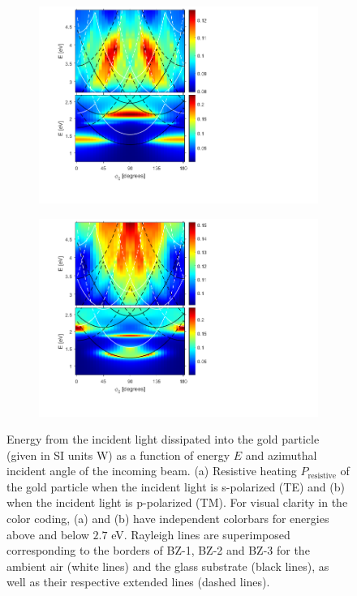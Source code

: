 \begin{figure}[h!]
    \begin{subfigure}{0.49\textwidth}
        \centering
        \includegraphics[width=\linewidth, trim=1.3cm  1.5cm 7.9cm 0cm, clip]{figures/ch4/S5B/contour/S5B_heatloss_TE_noscaling.png}
        \caption{}
        \label{}
    \end{subfigure}
    \begin{subfigure}{0.49\textwidth}
        \centering
        \includegraphics[width=\linewidth,trim=1.3cm  1.5cm 7.9cm 0cm, clip]{figures/ch4/S5B/contour/S5B_heatloss_TM_noscaling.png}
        \caption{}
        \label{}
    \end{subfigure}
    \label{fig:S5B_contour_heatloss}
    \caption{Energy from the incident light dissipated into the gold particle (given in SI units W) as a function of energy $E$ and azimuthal incident angle of the incoming beam. (a) Resistive heating $P_\text{resistive}$ of the gold particle when the incident light is s-polarized (TE) and (b) when the incident light is p-polarized (TM). For visual clarity in the color coding, (a) and (b) have independent colorbars for energies above and below $2.7$ eV. Rayleigh lines are superimposed corresponding to the borders of BZ-1, BZ-2 and BZ-3 for the ambient air (white lines) and the glass substrate (black lines), as well as their respective extended lines (dashed lines).}
\end{figure}



